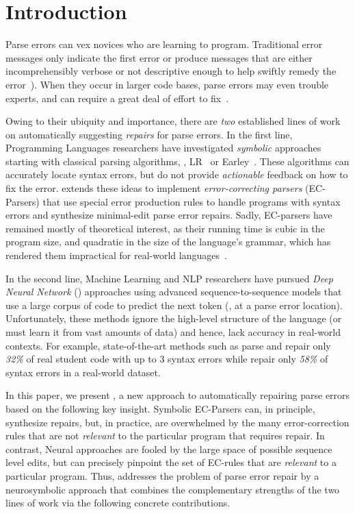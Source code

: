 
\section{Introduction}
\label{sec:intro}

Parse errors can vex novices who
are learning to program.
%
Traditional error messages
only indicate the first error
or produce messages that
are either incomprehensibly
verbose or not descriptive
enough to help swiftly remedy
the error~\citep{qian2017, VanDerSpek_2005}).
%
When they occur in larger code bases, parse errors
may even trouble experts, and can require a great deal of
effort to fix~\citep{Denny_2012, Ahadi_2018, Kummerfeld2003}.

Owing to their ubiquity and importance, there are \emph{two}
established lines of work on automatically suggesting \emph{repairs}
for parse errors.
%
In the first line, Programming Languages researchers
have investigated \emph{symbolic} approaches starting
with classical parsing algorithms, \eg, LR~\citep{Aho1974}
or Earley~\citep{Earley_1970}.
%
These algorithms can accurately locate syntax errors,
but do not provide \emph{actionable} feedback on how
to fix the error.
%
\citet{Aho_1972} extends these ideas to implement \emph{error-correcting
parsers} (EC-Parsers) that use special error production rules to handle programs
with syntax errors and synthesize minimal-edit parse error repairs.
%
Sadly, EC-parsers have remained mostly of theoretical
interest, as their running time is cubic in the
program size, and quadratic in the size of the language's
grammar, which has rendered them impractical for
real-world languages~\citep{McLean1996, Rajasekaran2014}.

In the second line, Machine Learning and NLP researchers have
pursued \emph{Deep Neural Network} (\dnn)
approaches using advanced sequence-to-sequence
models \citep{Sutskever_2014, Hardalov_2018}
that use a large corpus of code to predict
the next token (\eg, at a parse error location).
%
Unfortunately, these methods ignore the high-level structure
of the language (or must learn it from vast amounts
of data) and hence, lack accuracy in real-world contexts.
%
For example, state-of-the-art methods such as \citet{Ahmed_2021} parse and
repair only \emph{32\%} of real student code with up to 3 syntax errors
while \citet{Wu2020} repair only \emph{58\%} of syntax errors in a
real-world dataset.

In this paper, we present \toolname, a new approach
to automatically repairing parse errors
based on the following key insight.
%
Symbolic EC-Parsers \citep{Aho_1972} can, in principle,
synthesize repairs, but, in practice, are overwhelmed by
the many error-correction rules that are not \emph{relevant}
to the particular program that requires repair.
%
In contrast, Neural approaches are fooled by the large
space of possible sequence level edits, but can precisely
pinpoint the set of EC-rules that are \emph{relevant}
to a particular program.
%
Thus, \toolname addresses the problem of parse error
repair by a neurosymbolic approach that combines
the complementary strengths of the two lines of work
via the following concrete contributions.

